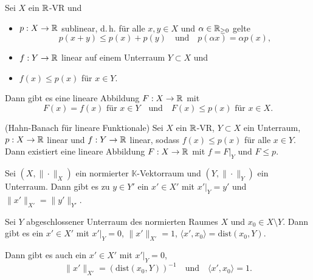 \documentclass{cheat-sheet}
\newcommand{\K}{\mathbb{K}}
\newcommand{\dist}{\mathrm{dist}} %
\begin{document}
\begin{satz}
  Sei $X$ ein $\mathbb{R}$-VR und
  \begin{itemize}
    \item $p : X \to \mathbb{R}$ sublinear, d.\,h. für alle $x, y \in X$ und $\alpha \in \mathbb{R}_{\geq 0}$ gelte
    \[ p(x+y) \leq p(x) + p(y) \quad \text{und} \quad p(\alpha x) = \alpha p(x), \]
    \item $f : Y \to \mathbb{R}$ linear auf einem Unterraum $Y \subset X$ und
    \item $f(x) \leq p(x)$ für $x \in Y$.
  \end{itemize}
  Dann gibt es eine lineare Abbildung $F : X \to \mathbb{R}$ mit
  \[ F(x) = f(x) \text{ für $x \in Y$} \quad \text{und} \quad F(x) \leq p(x) \text{ für } x \in X. \]
\end{satz}

\begin{satz}(Hahn-Banach für lineare Funktionale)
  Sei $X$ ein $\mathbb{R}$-VR, $Y \subset X$ ein Unterraum, $p : X \to \mathbb{R}$ linear und $f : Y \to \mathbb{R}$ linear, sodass $f(x) \leq p(x)$ für alle $x \in Y$. Dann existiert eine lineare Abbildung $F : X \to \mathbb{R}$ mit $f = F|_Y \text{ und } F \leq p$.
\end{satz}

\begin{satz}
  Sei $(X, \|\cdot\|_X)$ ein normierter $\K$-Vektorraum und $(Y, \|\cdot\|_Y)$ ein Unterraum. Dann gibt es zu $y \in Y'$ ein $x' \in X'$ mit $x'|_Y = y'$ und $\|x'\|_{X'} = \|y'\|_{Y'}$.
\end{satz}

\begin{satz}
  Sei $Y$ abgeschlossener Unterraum des normierten Raumes $X$ und $x_0 \in X \setminus Y$. Dann gibt es ein $x' \in X'$ mit $x'|_Y = 0$, $\|x'\|_{X'} = 1$, $\langle x', x_0 \rangle = \dist(x_0, Y)$.
\end{satz}

\begin{bem}
  Dann gibt es auch ein $x' \in X'$ mit $x'|_Y = 0$,
  \[ \|x'\|_{X'} = (\dist(x_0, Y))^{-1} \quad \text{und} \quad \langle x', x_0 \rangle = 1. \]
\end{bem}

\end{document}
